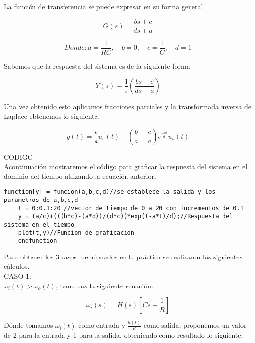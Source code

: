 \documentclass{report}
\newcounter{ns}
\begin{document}
	La función de transferencia se puede expresar en su forma general.
	
	\begin{equation*}
		G(s)=\frac{bs+c}{ds+a}
	\end{equation*}
	
	\begin{equation*}
	Donde:
		a=\frac{1}{RC},\quad b=0,\quad c=\frac{1}{C},\quad d=1
	\end{equation*}
	
	Sabemos que la respuesta del sistema es de la siguiente forma.
	
	\begin{equation*}
		Y(s)=\frac{1}{s}\left(\frac{bs+c}{ds+a}\right)
	\end{equation*}
	
	Una vez obtenido esto aplicamos fracciones parciales y la transformada inversa de Laplace obtenemos lo siguiente.
	
	\begin{equation*}
		y(t)=\frac{c}{a}u_s(t)+\left(\frac{b}{a}-\frac{c}{a}\right)e^\frac{-at}{d}u_s(t)
	\end{equation*}
	
	CODIGO\\
	
	Acontinuación mostraremos el código para graficar la respuesta del sistema en el dominio del tiempo utlizando la ecuación anterior.
	
	\begin{lstlisting}[frame=single]
	function[y] = funcion(a,b,c,d)//se establece la salida y los parametros de a,b,c,d
	t = 0:0.1:20 //vector de tiempo de 0 a 20 con incrementos de 0.1
	y = (a/c)+(((b*c)-(a*d))/(d*c))*exp((-a*t)/d);//Respuesta del sistema en el tiempo
	plot(t,y)//Funcion de graficacion
	endfunction
	\end{lstlisting}
		
	Para obtener los 3 casos mencionados en la práctica se realizaron los siguientes cálculos.\\
	
	CASO 1:\\
	
	$\omega_i(t) > \omega_o(t)$, tomamos la siguiente ecuación:
	
	\begin{equation*}
		\omega_i(s)=H(s)\left[Cs+\frac{1}{R}\right]
	\end{equation*}
		
	Dónde tomamos $\omega_i(t)$ como entrada y $\frac{h(t)}{R}$ como salida, proponemos un valor de 2 para la entrada y 1 para la salida, obteniendo como resultado lo siguiente:
	
\end{document}
